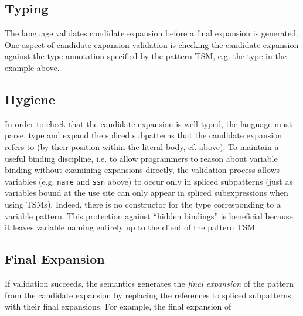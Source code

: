 {{{\subsection{Typing}\label{sec:ptsms-validation}
The language validates candidate expansion before a final expansion is generated. One aspect of candidate expansion validation is checking the candidate expansion against the type annotation specified by the pattern TSM, e.g. the type  in the example above.

\subsection{Hygiene}\label{sec:ptsms-hygiene}
In order to check that the candidate expansion is well-typed, the language must parse, type and expand the spliced subpatterns that the candidate expansion refers to (by their position within the literal body, cf. above). To maintain a useful binding discipline, i.e. to allow programmers to reason about variable binding without examining expansions directly, the validation process allows variables (e.g. \lstinline{name} and \lstinline{ssn} above) to occur only in spliced subpatterns (just as variables bound at the use site can only appear in spliced subexpressions when using TSMs). Indeed, there is no constructor for the type  corresponding to a variable pattern. This protection against ``hidden bindings'' is beneficial because it leaves variable naming entirely up to the client of the pattern TSM. 

\subsection{Final Expansion}\label{sec:ptsms-final-expansion}
If validation succeeds, the semantics generates the \emph{final expansion} of the pattern from the candidate expansion by replacing the references to spliced subpatterns with their final expansions. For example, the final expansion of \li{#\dolla#rx /SURL@EURLnameSURL: %
\begin{lstlisting}[numbers=none]
Seq(Str(name), Seq(Str "SSTR: ESTR", ssn))
\end{lstlisting}

\section{\texorpdfstring{$\miniVersePat$}{miniVerseU}}\label{sec:miniVerseUP}
To make the intuitions developed in the previous section about pattern TSMs precise, we  now introduce a reduced calculus with support for both unparameterized expression TSMs and unparameterized pattern TSMs called $\miniVersePat$.
}}}}

